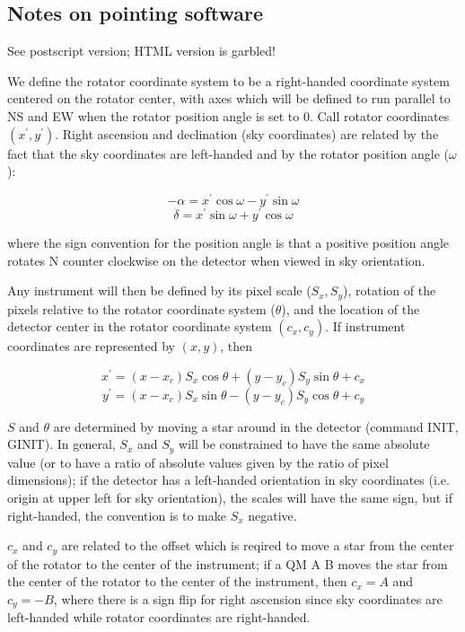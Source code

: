 \documentclass{article}[12pt]
\begin{document}
\subsection{Notes on pointing software}

\begin{htmlonly}
See postscript version; HTML version is garbled!
\end{htmlonly}
\begin{latexonly}
We define the rotator coordinate system to be a right-handed coordinate
system centered on the rotator center, with axes which will be defined
to run parallel to NS and EW when the rotator position angle is set to 0.
Call rotator coordinates $(x^\prime,y^\prime)$. Right ascension and 
declination (sky coordinates) are related by the fact that the sky
coordinates are left-handed and by the rotator position angle ($\omega$):

$$-\alpha = x^\prime \cos\omega - y^\prime \sin\omega$$
$$\delta = x^\prime \sin\omega + y^\prime \cos\omega$$

where the sign convention for the position angle is that a positive
position angle rotates N counter clockwise on the detector when viewed
in sky orientation.

Any instrument will then be defined by its pixel scale ($S_x, S_y$), rotation
of the pixels relative to the rotator coordinate system ($\theta$),
and the location of the detector center in the rotator coordinate system
$(c_x,c_y)$. If instrument coordinates are represented by $(x,y)$, then

$$x^\prime = (x-x_c) S_x \cos\theta + (y-y_c) S_y \sin\theta + c_x$$
$$y^\prime = (x-x_c) S_x \sin\theta - (y-y_c) S_y \cos\theta + c_y$$

$S$ and $\theta$ are determined by moving a star around in the detector
(command INIT, GINIT). In general, $S_x$ and $S_y$ will be constrained
to have the same absolute value (or to have a ratio of absolute values
given by the ratio of pixel dimensions); if the detector has a left-handed
orientation in sky coordinates (i.e. origin at upper left for sky
orientation), the scales will have the same sign, but if right-handed,
the convention is to make $S_x$ negative.

$c_x$ and $c_y$ are related to the offset which
is reqired to move a star from the center of the rotator to the center
of the instrument; if a QM A B moves the star from the center of the
rotator to the center of the instrument, then $c_x = A$ and $c_y = -B$,
where there is a sign flip for right ascension since sky coordinates
are left-handed while rotator coordinates are right-handed.


\end{latexonly}
\end{document}
